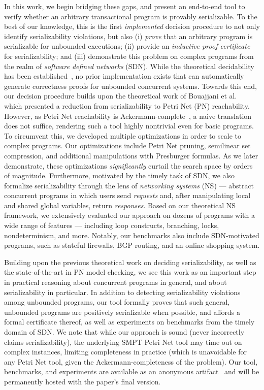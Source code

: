 In this work, we begin bridging these gaps, and present an end-to-end tool to verify whether an arbitrary transactional program is provably serializable.
To the best of our knowledge, this is the first \emph{implemented} decision procedure to not only identify serializability violations, but also (i) \textit{prove} that an arbitrary program is serializable for unbounded executions; (ii) provide an \textit{inductive proof certificate} for serializability; and (iii) demonstrate this problem on complex programs from the realm of \textit{software defined networks} (SDN).
While the theoretical decidability has been established~\cite{BoEmEnHa13}, no prior implementation exists that can automatically generate correctness proofs for unbounded concurrent systems.
%
Towards this end, our decision procedure builds upon the theoretical work of Bouajjani et al.~\cite{BoEmEnHa13} which presented a reduction from serializability to Petri Net (PN) reachability.  However, as Petri Net reachability is Ackermann-complete~\cite{CzWo22}, a naive translation does not suffice, rendering such a tool highly nontrivial even for basic programs. To circumvent this, we developed multiple optimizations in order to scale to complex programs. 
Our optimizations include Petri Net pruning, semilinear set compression, and additional manipulations with Presburger formulas.
As we later demonstrate, these optimizations \textit{significantly} curtail the search space by orders of magnitude.
%
Furthermore, motivated by the timely task of SDN, 
we also formalize serializability through the lens of \textit{networking systems} (NS) --- abstract concurrent programs in which users send \textit{requests} and, after manipulating local and shared global variables, return \textit{responses}.
Based on our theoretical NS framework, we extensively evaluated our approach on dozens of programs with a wide range of features --- including loop constructs, branching, locks, nondeterminism, and more. Notably, our benchmarks also include SDN-motivated programs, such as stateful firewalls, BGP routing, and an online shopping system.


Building upon the previous theoretical work on deciding serializability, as well as the state-of-the-art in PN model checking, we see this work as an important step in practical reasoning about concurrent programs in general, and about serializability in particular.
In addition to detecting serializability violations among unbounded programs, our tool formally proves that such general, unbounded programs are positively serializable when possible, and affords a formal certificate thereof, as well as experiments on benchmarks from the timely domain of SDN.
We note that while our approach is sound (never incorrectly claims serializability), the underlying SMPT Petri Net tool may time out on complex instances, limiting completeness in practice (which is unavoidable for any Petri Net tool, given the Ackermann-completeness of the problem).
Our tool, benchmarks, and experiments are available as an anonymous artifact~\cite{ArtifactRepository} and will be permanently hosted with the paper’s final version.

